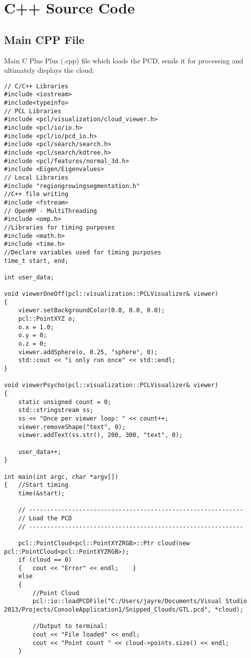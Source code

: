 \chapter{C++ Source Code}
\label{AppendixA}
\section{Main CPP File}
Main C Plus Plus (.cpp) file which loads the PCD, sends it for processing and ultimately displays the cloud:
\linespread{0.9}
\begin{lstlisting}
// C/C++ Libraries
#include <iostream>
#include<typeinfo>
// PCL Libraries
#include <pcl/visualization/cloud_viewer.h>
#include <pcl/io/io.h>
#include <pcl/io/pcd_io.h>
#include <pcl/search/search.h>
#include <pcl/search/kdtree.h>
#include <pcl/features/normal_3d.h>
#include <Eigen/Eigenvalues>
// Local Libraries
#include "regiongrowingsegmentation.h"
//C++ file writing
#include <fstream>
// OpenMP - MultiThreading
#include <omp.h>
//Libraries for timing purposes
#include <math.h>
#include <time.h>
//Declare variables used for timing purposes
time_t start, end;

int user_data;

void viewerOneOff(pcl::visualization::PCLVisualizer& viewer)
{
	viewer.setBackgroundColor(0.0, 0.0, 0.0);
	pcl::PointXYZ o;
	o.x = 1.0;
	o.y = 0;
	o.z = 0;
	viewer.addSphere(o, 0.25, "sphere", 0);
	std::cout << "i only run once" << std::endl;
}

void viewerPsycho(pcl::visualization::PCLVisualizer& viewer)
{
	static unsigned count = 0;
	std::stringstream ss;
	ss << "Once per viewer loop: " << count++;
	viewer.removeShape("text", 0);
	viewer.addText(ss.str(), 200, 300, "text", 0);

	user_data++;
}

int main(int argc, char *argv[])
{	//Start timing
	time(&start);
		
	// ------------------------------------------------------------
	// Load the PCD
	// ------------------------------------------------------------

	pcl::PointCloud<pcl::PointXYZRGB>::Ptr cloud(new pcl::PointCloud<pcl::PointXYZRGB>);
	if (cloud == 0)
	{	cout << "Error" << endl;	}
	else
	{
		//Point Cloud
		pcl::io::loadPCDFile("C:/Users/jayre/Documents/Visual Studio 2013/Projects/ConsoleApplication1/Snipped_Clouds/GTL.pcd", *cloud);
		
		//Output to terminal:
		cout << "File loaded" << endl;
		cout << "Point count " << cloud->points.size() << endl;
	}


\end{lstlisting}
